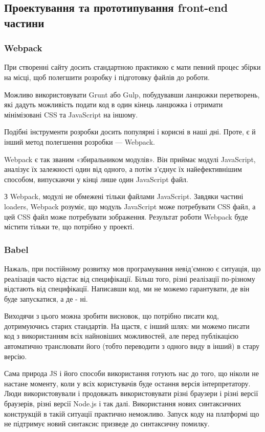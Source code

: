 \subsection{Проектування та прототипування front-end частини}

\subsubsection{Webpack}

При створенні сайту досить стандартною практикою є мати певний процес збірки на місці, щоб полегшити розробку і підготовку файлів до роботи.

Можливо використовувати Grunt або Gulp, побудувавши ланцюжки перетворень, які дадуть можливість подати код в один кінець ланцюжка і отримати мінімізовані CSS та JavaScript на іншому.

Подібні інструменти розробки досить популярні і корисні в наші дні. Проте, є й інший метод полегшення розробки — Webpack.

Webpack є так званим «збиральником модулів». Він приймає модулі JavaScript, аналізує їх залежності один від одного, а потім з'єднує їх найефективнішим способом, випускаючи у кінці лише один JavaScript файл.

З Webpack, модулі не обмежені тільки файлами JavaScript. Завдяки частині loaders, Webpack розуміє, що модуль JavaScript може потребувати CSS файл, а цей CSS файл може потребувати зображення. Результат роботи Webpack буде містити тільки те, що потрібно у проекті.

\subsubsection{Babel}

Нажаль, при постійному розвитку мов програмування невід'ємною є ситуація, що реалізація часто відстає від специфікації. Більш того, різні реалізації по-різному відстають від специфікації. Написавши код, ми не можемо гарантувати, де він буде запускатися, а де - ні.

Виходячи з цього можна зробити висновок, що потрібно писати код, дотримуючись старих стандартів. На щастя, є інший шлях: ми можемо писати код з використанням всіх найновіших можливостей, але перед публікацією автоматично транслювати його (тобто переводити з одного виду в інший) в стару версію. 

Сама природа JS і його способи використання готують нас до того, що ніколи не настане моменту, коли у всіх користувачів буде остання версія інтерпретатору. Люди використовували і продовжать використовувати різні браузери і різні версії браузерів, різні версії Node.js і так далі. Використання нових синтаксичних конструкцій в такій ситуації практично неможливо. Запуск коду на платформі що не підтримує новий синтаксис призведе до синтаксичну помилку. 


